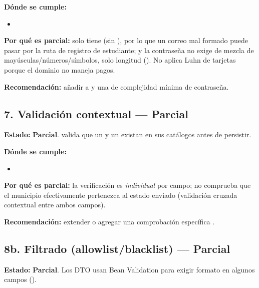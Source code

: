 \documentclass[11pt,a4paper]{article}
\newcommand{\Parcial}{\textcolor{parcialColor}{\textbf{Parcial}}}
\begin{document}
\textbf{Dónde se cumple:}
\begin{itemize}[leftmargin=1.2cm,nosep]
\item \texttt{}
\end{itemize}

\textbf{Por qué es parcial:} \texttt{} solo tiene \texttt{} (sin \texttt{}), por lo que un correo mal formado puede pasar por la ruta de registro de estudiante; y la contraseña no exige \texttt{} de mezcla de mayúsculas/números/símbolos, solo longitud (\texttt{}). No aplica Luhn de tarjetas porque el dominio no maneja pagos.

\textbf{Recomendación:} añadir \texttt{} a \texttt{} y una \texttt{} de complejidad mínima de contraseña.

\subsection{7. Validación contextual --- \Parcial}

\textbf{Estado:} \Parcial. \texttt{} valida que un \texttt{} y un \texttt{} existan en sus catálogos antes de persistir.

\textbf{Dónde se cumple:}
\begin{itemize}[leftmargin=1.2cm,nosep]
\item \texttt{}
\end{itemize}

\textbf{Por qué es parcial:} la verificación es \emph{individual} por campo; no comprueba que el municipio efectivamente pertenezca al estado enviado (validación cruzada contextual entre ambos campos).

\textbf{Recomendación:} extender \texttt{} o agregar una comprobación específica \texttt{}.

\subsection{8b. Filtrado (allowlist/blacklist) --- \Parcial}

\textbf{Estado:} \Parcial. Los DTO usan Bean Validation para exigir formato en algunos campos (\texttt{}).
\end{document}
